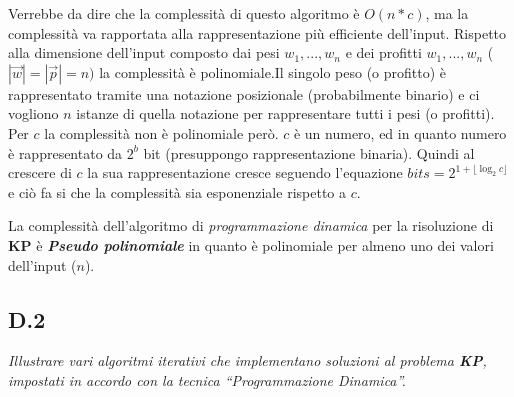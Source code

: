 \documentclass[a4paper]{article}
\newcommand{\imp}[1]{\textbf{\textit{#1}}}
\begin{document}
Verrebbe da dire che la complessità di questo algoritmo è $O(n*c)$, ma la complessità va rapportata alla rappresentazione più efficiente dell'input.
Rispetto alla dimensione dell'input composto dai pesi $w_1, ..., w_n$ e dei profitti $w_1, ... , w_n$ ($| \vec w | = | \vec p | = n)$ la complessità è polinomiale.Il singolo peso (o profitto) è rappresentato tramite una notazione posizionale (probabilmente binario) e ci vogliono $n$ istanze di quella notazione per rappresentare tutti i pesi (o profitti).\\
Per $c$ la complessità non è polinomiale però. $c$ è un numero, ed in quanto numero è rappresentato da $2^b$ bit (presuppongo rappresentazione binaria).
Quindi al crescere di $c$ la sua rappresentazione cresce seguendo l'equazione $bits = 2^{1 + \lfloor \log_2c \rfloor}$ e ciò fa si che la complessità sia esponenziale rispetto a $c$.

La complessità dell'algoritmo di \textit{programmazione dinamica} per la risoluzione di \textbf{KP} è \imp{Pseudo polinomiale} in quanto è polinomiale per almeno uno dei valori dell'input ($n$).

\subsection{D.2}
\emph{Illustrare vari algoritmi iterativi che implementano soluzioni al problema \textbf{KP}, impostati in accordo con la tecnica “Programmazione Dinamica”.}
\end{document}
